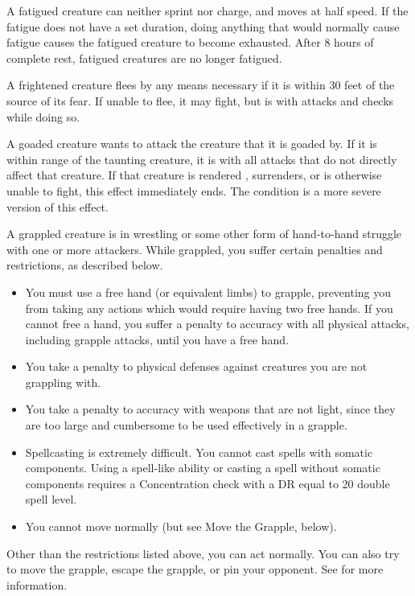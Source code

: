  A fatigued creature can neither sprint nor charge, and moves at half speed. If the fatigue does not have a set duration, doing anything that would normally cause fatigue causes the fatigued creature to become exhausted. After 8 hours of complete rest, fatigued creatures are no longer fatigued.

 A frightened creature flees by any means necessary if it is within 30 feet of the source of its fear. If unable to flee, it may fight, but is \severelyimpaired with attacks and checks while doing so.

 A goaded creature wants to attack the creature that it is goaded by.
If it is within \rngmed range of the taunting creature, it is \impaired with all attacks that do not directly affect that creature.
If that creature is rendered \helpless, surrenders, or is otherwise unable to fight, this effect immediately ends.
The  condition is a more severe version of this effect.

 A grappled creature is in wrestling or some other form of hand-to-hand struggle with one or more attackers. While grappled, you suffer certain penalties and restrictions, as described below.

\begin{itemize}
    \item You must use a free hand (or equivalent limbs) to grapple, preventing you from taking any actions which would require having two free hands. If you cannot free a hand, you suffer a  penalty to accuracy with all physical attacks, including grapple attacks, until you have a free hand.
    \item You take a  penalty to physical defenses against creatures you are not grappling with.
    \item You take a  penalty to accuracy with weapons that are not light, since they are too large and cumbersome to be used effectively in a grapple.
    \item Spellcasting is extremely difficult. You cannot cast spells with somatic components. Using a spell-like ability or casting a spell without somatic components requires a Concentration check with a DR equal to 20 \add double spell level.
    \item You cannot move normally (but see Move the Grapple, below).
\end{itemize}

Other than the restrictions listed above, you can act normally. You can also try to move the grapple, escape the grapple, or pin your opponent. See  for more information.

